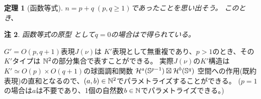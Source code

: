 \documentclass[12pt]{article} %
\newtheorem{theorem}{定理}
\newtheorem{remark}[theorem]{注}
\theoremstyle{definition}
\theoremstyle{exampstyle} \newtheorem{examp}[theorem]{Theorem}
\begin{document}
	\begin{theorem}[函数等式]
		$n=p+q\;(p,q\ge1)$で{あった}ことを思い出そう。
	このとき、
	\end{theorem}
	\begin{remark}
		函数等式の原型
		として$q=0$の場合は\cite[Thm. 12.6]{kobayashi2015program}で得られている。
	\end{remark}
	$G'=O(p,q+1)$表現$J(\nu)$は $K'$表現として無重複であり、$p>1$のとき、その$K'$タイプは $\mathbb{N}^2$の部分集合で表すことができる。
	実際$J(\nu)$の$K'$構造は$K'\simeq O(p)\times O(q+1)$の球面調和関数
	$\mathcal{H}^a(\mathbb{S}^{p-1})\boxtimes\mathcal{H}^b(\mathbb{S}^q)$
	空間への作用(既約表現)の直和となるので、$(a,b)\in\mathbb{N}^2$でパラメトライズすることができる。
	($p=1$の場合は$a$は不要であり、1個の自然数$b\in\mathbb{N}$でパラメトライズできる。)
\end{document}
